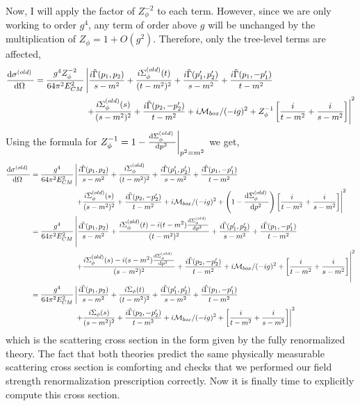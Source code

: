 \documentclass{article}
\begin{document}
Now, I will apply the factor of $Z_\phi^{-2}$ to each term. However, since we are only working to order $g^4$, any term of order above $g$ will be unchanged by the multiplication of $Z_\phi = 1 + O(g^2)$. Therefore, only the tree-level terms are affected,
\begin{align*}
\frac{\mathrm{d}\sigma^{(old)} \:}{\mathrm{d}\Omega \:} &= \frac{g^4 Z_\phi^{-2}}{64 \pi^2 E_{CM}^2} \left|  \frac{ i\tilde{\Gamma}(p_1, p_2)}{s  - m^2} + \frac{i \Sigma_\phi^{(old)}(t)}{(t - m^2)^2} + \frac{i\tilde{\Gamma}(p_1', p_2')}{s - m^2} 
+  \frac{i\tilde{\Gamma}(p_1, -p_1')}{t - m^2} \right.
\\ 
& \left.
\quad \quad \quad \quad \quad \quad 
+ \frac{i \Sigma_\phi^{(old)}(s)}{(s - m^2)^2} + \frac{i\tilde{\Gamma}(p_2, -p_2')}{t - m^2} + i\mathcal{M}_{box}/(-ig)^2 + Z_\phi^{-1} \left[\frac{i}{t - m^2 } + \frac{i}{s - m^2 }\right] \right|^2 
\end{align*}  
Using the formula for $Z_\phi^{-1} = 1 - \frac{\mathrm{d}\Sigma_\phi^{(old)} \:}{\mathrm{d}p^2 \:} \bigg|_{p^2 = m^2}$ we get,
\begin{align*}
\frac{\mathrm{d}\sigma^{(old)} \:}{\mathrm{d}\Omega \:} &= \frac{g^4}{64 \pi^2 E_{CM}^2} \left|  \frac{i\tilde{\Gamma}(p_1, p_2)}{s  - m^2} + \frac{i \Sigma_\phi^{(old)}}{(t - m^2)^2} + \frac{i\tilde{\Gamma}(p_1', p_2')}{s - m^2} 
+  \frac{i\tilde{\Gamma}(p_1, -p_1')}{t - m^2} \right.
\\ 
& \left.
\quad \quad \quad \quad \quad \quad 
+ \frac{i \Sigma_\phi^{(old)}(s)}{(s - m^2)^2} + \frac{i\tilde{\Gamma}(p_2, -p_2')}{t - m^2} + i\mathcal{M}_{box}/(-ig)^2 + \left( 1 - \frac{\mathrm{d}\Sigma_\phi^{(old)} \:}{\mathrm{d}p^2 \:} \right) \left[\frac{i}{t - m^2 } + \frac{i}{s - m^2 }\right] \right|^2  
\\
&= \frac{g^4}{64 \pi^2 E_{CM}^2} \left|  \frac{ i\tilde{\Gamma}(p_1, p_2)}{s  - m^2} + \frac{i \Sigma_\phi^{(old)}(t) - i(t - m^2) \frac{\mathrm{d}\Sigma_\phi^{(old)} \:}{\mathrm{d}p^2 \:}}{(t - m^2)^2} + \frac{i\tilde{\Gamma}(p_1', p_2')}{s - m^2} 
+  \frac{i\tilde{\Gamma}(p_1, -p_1')}{t - m^2} \right.
\\ 
& \left.
\quad \quad \quad \quad \quad \quad 
+ \frac{i \Sigma_\phi^{(old)}(s) - i(s - m^2) \frac{\mathrm{d}\Sigma_\phi^{(old)} \:}{\mathrm{d}p^2 \:} }{(s - m^2)^2} + \frac{i\tilde{\Gamma}(p_2, -p_2')}{t - m^2} + i\mathcal{M}_{box}/(-ig)^2 + \left[\frac{i}{t - m^2 } + \frac{i}{s - m^2 }\right] \right|^2
\\
&= \frac{g^4}{64 \pi^2 E_{CM}^2} \left|  \frac{i \tilde{\Gamma}(p_1, p_2)}{s  - m^2} + \frac{i \Sigma_\phi(t)}{(t - m^2)^2} + \frac{i\tilde{\Gamma}(p_1', p_2')}{s - m^2} 
+  \frac{i\tilde{\Gamma}(p_1, -p_1')}{t - m^2} \right.
\\ 
& \left.
\quad \quad \quad \quad \quad \quad 
+ \frac{i \Sigma_\phi(s)}{(s - m^2)^2} + \frac{i\tilde{\Gamma}(p_2, -p_2')}{t - m^2} + i\mathcal{M}_{box}/(-ig)^2 + \left[\frac{i}{t - m^2 } + \frac{i}{s - m^2 }\right] \right|^2    
\end{align*}  
which is the scattering cross section in the form given by the fully renormalized theory. The fact that both theories predict the same physically measurable scattering cross section is comforting and checks that we performed our field strength renormalization prescription correctly. Now it is finally time to explicitly compute this cross section.
\end{document}

